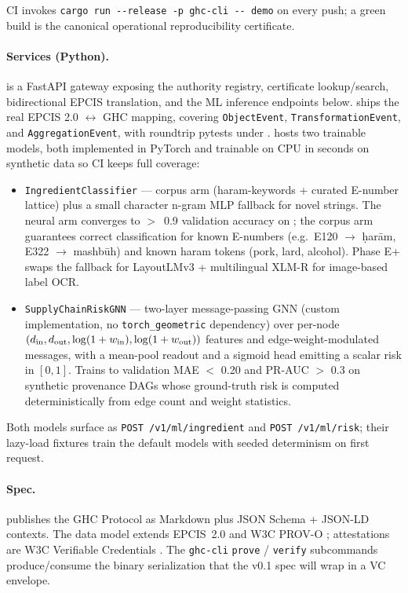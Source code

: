 CI invokes \texttt{cargo run -{}-release -p ghc-cli -{}- demo} on
every push; a green build is the canonical operational
reproducibility certificate.

\paragraph{Services (Python).}
 is a FastAPI gateway exposing the
authority registry, certificate lookup/search, bidirectional
EPCIS translation, and the ML inference endpoints below.
 ships the real EPCIS 2.0
$\leftrightarrow$ GHC mapping, covering \texttt{ObjectEvent},
\texttt{TransformationEvent}, and \texttt{AggregationEvent}, with
roundtrip pytests under .
 hosts two trainable models, both
implemented in PyTorch and trainable on CPU in seconds on
synthetic data so CI keeps full coverage:
\begin{itemize}
\item \texttt{IngredientClassifier} — corpus arm
  (haram-keywords + curated E-number lattice) plus a small
  character n-gram MLP fallback for novel strings. The neural
  arm converges to $>$~0.9 validation accuracy on
  ; the
  corpus arm guarantees correct classification for known
  E-numbers (e.g.\ E120 $\to$ ḥarām, E322 $\to$ mashbūh) and
  known haram tokens (pork, lard, alcohol). Phase E+ swaps the
  fallback for LayoutLMv3 \cite{layoutlm} + multilingual XLM-R
  for image-based label OCR.
\item \texttt{SupplyChainRiskGNN} — two-layer message-passing GNN
  (custom implementation, no
  \texttt{torch\_geometric} dependency) over per-node
  $(d_{\rm in}, d_{\rm out}, \log(1 + w_{\rm in}),
  \log(1 + w_{\rm out}))$ features and edge-weight-modulated
  messages, with a mean-pool readout and a sigmoid head emitting
  a scalar risk in $[0, 1]$. Trains to validation MAE $<$ 0.20
  and PR-AUC $>$ 0.3 on synthetic provenance DAGs whose
  ground-truth risk is computed deterministically from edge
  count and weight statistics.
\end{itemize}
Both models surface as \texttt{POST /v1/ml/ingredient} and
\texttt{POST /v1/ml/risk}; their lazy-load fixtures train the
default models with seeded determinism on first request.

\paragraph{Spec.}
 publishes the GHC Protocol as Markdown plus JSON Schema +
JSON-LD contexts. The data model extends EPCIS~2.0 \cite{epcis2} and
W3C PROV-O \cite{provo}; attestations are W3C Verifiable Credentials
\cite{vc}. The \texttt{ghc-cli} \texttt{prove} / \texttt{verify}
subcommands produce/consume the binary serialization that the v0.1
spec will wrap in a VC envelope.

